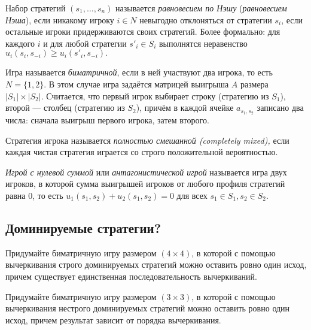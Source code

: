 Набор стратегий $(s_1,\ldots,s_n)$ называется {\it равновесием по Нэшу} ({\it равновесием Нэша}), если никакому игроку $i \in N$ невыгодно отклоняться от стратегии $s_i$, если остальные игроки придерживаются своих стратегий. Более формально: для каждого $i$ и для любой стратегии $s'_i \in S_i$ выполнятся неравенство $u_i(s_i,s_{-i}) \geq u_i(s'_i,s_{-i}).$

Игра называется \textit{биматричной}, если в ней участвуют два игрока, то есть $N = \{1,2\}$. В этом случае игра задаётся матрицей выигрыша $A$ размера $|S_1| \times |S_2|$. Считается, что первый игрок выбирает строку (стратегию из $S_1$), второй --- столбец (стратегию из $S_2$), причём в каждой ячейке $a_{s_1,s_2}$ записано два числа: сначала выигрыш первого игрока, затем второго. 

Стратегия игрока называется {\it полностью смешанной (completely mixed),} если каждая чистая стратегия играется со строго положительной вероятностью.

\textit{Игрой с нулевой суммой} или {\it антагонистической игрой} называется игра двух игроков, в которой сумма выигрышей игроков от любого профиля стратегий равна $0$, то есть $u_1(s_1,s_2)+u_2(s_1,s_2)=0$ для всех $s_1 \in S_1, s_2 \in S_2$.


\subsection{Доминируемые стратегии?}

\begin{problem}[Конструктор-4]
Придумайте биматричную игру размером  $\left(4\times 4\right)$, в которой с помощью вычеркивания строго доминируемых стратегий можно оставить ровно один исход, причем существует единственная последовательность вычеркиваний.
\begin{sol}
\end{sol}
\end{problem}

\begin{problem}[Конструктор-3]
Придумайте биматричную игру размером  $\left(3\times 3\right)$, в которой с помощью вычеркивания нестрого доминируемых стратегий можно оставить ровно один исход, причем результат зависит от порядка вычеркивания.\par
\begin{sol}
\end{sol}
\end{problem}

